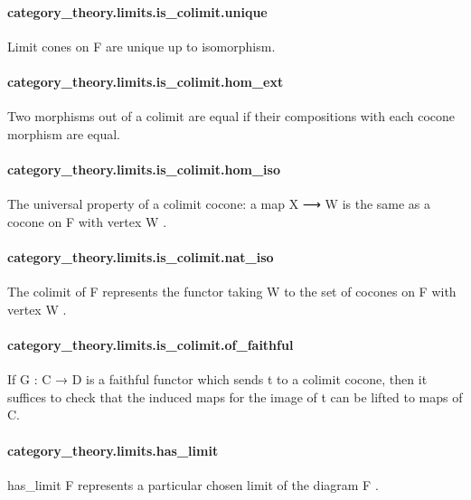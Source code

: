 \documentclass{article}
\begin{document}
\paragraph{category\_theory.limits.is\_colimit.unique}
\par
Limit cones on 
\colorbox[RGB]{253,246,227}{{{{\color[RGB]{101, 123, 131} F }}}} are unique up to isomorphism.
\paragraph{category\_theory.limits.is\_colimit.hom\_ext}
\par
Two morphisms out of a colimit are equal if their compositions with
each cocone morphism are equal.
\paragraph{category\_theory.limits.is\_colimit.hom\_iso}
\par
The universal property of a colimit cocone: a map 
\colorbox[RGB]{253,246,227}{{{{\color[RGB]{101, 123, 131} X ⟶ W }}}} is the same as
a cocone on 
\colorbox[RGB]{253,246,227}{{{{\color[RGB]{101, 123, 131} F }}}} with vertex 
\colorbox[RGB]{253,246,227}{{{{\color[RGB]{101, 123, 131} W }}}}.
\paragraph{category\_theory.limits.is\_colimit.nat\_iso}
\par
The colimit of 
\colorbox[RGB]{253,246,227}{{{{\color[RGB]{101, 123, 131} F }}}} represents the functor taking 
\colorbox[RGB]{253,246,227}{{{{\color[RGB]{101, 123, 131} W }}}} to
the set of cocones on 
\colorbox[RGB]{253,246,227}{{{{\color[RGB]{101, 123, 131} F }}}} with vertex 
\colorbox[RGB]{253,246,227}{{{{\color[RGB]{101, 123, 131} W }}}}.
\paragraph{category\_theory.limits.is\_colimit.of\_faithful}
\par
If G : C → D is a faithful functor which sends t to a colimit cocone,
then it suffices to check that the induced maps for the image of t
can be lifted to maps of C.
\paragraph{category\_theory.limits.has\_limit}
\par
\colorbox[RGB]{253,246,227}{{{{\color[RGB]{101, 123, 131} has\_limit F }}}} represents a particular chosen limit of the diagram 
\colorbox[RGB]{253,246,227}{{{{\color[RGB]{101, 123, 131} F }}}}.
\end{document}
